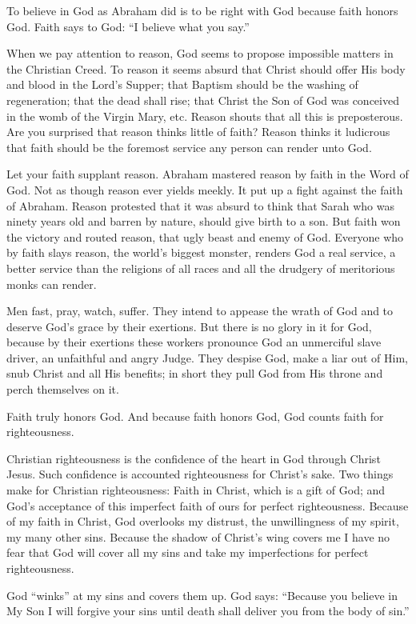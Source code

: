 To believe in God as Abraham did is to be right with God because faith honors God. Faith says to God: “I believe what you say.”

When we pay attention to reason, God seems to propose impossible matters in the Christian Creed. To reason it seems absurd that Christ should offer His body and blood in the Lord’s Supper; that Baptism should be the washing of regeneration; that the dead shall rise; that Christ the Son of God was conceived in the womb of the Virgin Mary, etc. Reason shouts that all this is preposterous. Are you surprised that reason thinks little of faith? Reason thinks it ludicrous that faith should be the foremost service any person can render unto God.

Let your faith supplant reason. Abraham mastered reason by faith in the Word of God. Not as though reason ever yields meekly. It put up a fight against the faith of Abraham. Reason protested that it was absurd to think that Sarah who was ninety years old and barren by nature, should give birth to a son. But faith won the victory and routed reason, that ugly beast and enemy of God. Everyone who by faith slays reason, the world’s biggest monster, renders God a real service, a better service than the religions of all races and all the drudgery of meritorious monks can render.

Men fast, pray, watch, suffer. They intend to appease the wrath of God and to deserve God’s grace by their exertions. But there is no glory in it for God, because by their exertions these workers pronounce God an unmerciful slave driver, an unfaithful and angry Judge. They despise God, make a liar out of Him, snub Christ and all His benefits; in short they pull God from His throne and perch themselves on it.

Faith truly honors God. And because faith honors God, God counts faith for righteousness.

Christian righteousness is the confidence of the heart in God through Christ Jesus. Such confidence is accounted righteousness for Christ’s sake. Two things make for Christian righteousness: Faith in Christ, which is a gift of God; and God’s acceptance of this imperfect faith of ours for perfect righteousness. Because of my faith in Christ, God overlooks my distrust, the unwillingness of my spirit, my many other sins. Because the shadow of Christ’s wing covers me I have no fear that God will cover all my sins and take my imperfections for perfect righteousness.

God “winks” at my sins and covers them up. God says: “Because you believe in My Son I will forgive your sins until death shall deliver you from the body of sin.”

